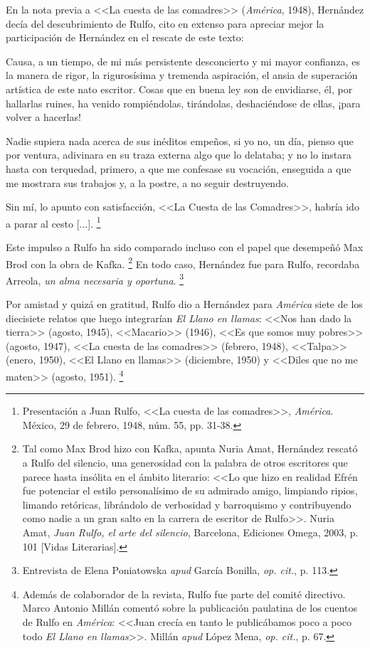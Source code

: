 \documentclass[14pt,twoside,final]{extbook} %
\let\oldfootnote\footnote
\renewcommand\footnote[1]{%
\oldfootnote{\hspace{1mm}#1}}
\begin{document}
En la nota previa a <<La cuesta de las comadres>> (\emph{América}, 1948), Hernández
decía del descubrimiento de Rulfo, cito en extenso para apreciar mejor la
participación de Hernández en el rescate de este texto:
\begin{quoting}
Causa, a un tiempo, de mi más persistente desconcierto y mi mayor confianza, es la manera de rigor, la rigurosísima y tremenda aspiración, el ansia de superación artística de este nato escritor. Cosas que en buena ley son de envidiarse, él, por hallarlas ruines, ha venido rompiéndolas, tirándolas, deshaciéndose de ellas, ¡para volver a hacerlas!

Nadie supiera nada acerca de sus inéditos empeños, si yo no, un día, pienso que por ventura, adivinara en su traza externa algo que lo delataba; y no lo instara hasta con terquedad, primero, a que me confesase su vocación, enseguida a que me mostrara sus trabajos y, a la postre, a no seguir destruyendo.

Sin mí, lo apunto con satisfacción, <<La Cuesta de las Comadres>>, habría ido a parar al cesto [...].\footnote{Presentación a Juan Rulfo, <<La cuesta de las comadres>>, \emph{América}. México, 29 de febrero, 1948, núm. 55, pp. 31-38.}
\end{quoting}
Este impulso a Rulfo ha sido comparado incluso con el papel que desempeñó Max
Brod con la obra de Kafka.\footnote{Tal como Max Brod hizo con Kafka, apunta Nuria Amat, Hernández rescató a Rulfo del silencio, una generosidad con la palabra de otros escritores que parece hasta insólita en el ámbito literario: <<Lo que hizo en realidad Efrén fue potenciar el estilo personalísimo de su admirado amigo, limpiando
ripios, limando retóricas, librándolo de verbosidad y barroquismo y contribuyendo como nadie a un gran salto en la carrera de escritor de Rulfo>>. Nuria Amat, \emph{Juan Rulfo, el arte del silencio}, Barcelona, Ediciones Omega, 2003, p. 101 [Vidas Literarias].} En todo caso, Hernández fue para Rulfo, recordaba
Arreola, \emph{un alma necesaria y oportuna}.\footnote{Entrevista de Elena Poniatowska \emph{apud} García Bonilla, \emph{op. cit.}, p. 113.}

Por amistad y quizá en gratitud, Rulfo dio a Hernández para \emph{América} siete de
los diecisiete relatos que luego integrarían \emph{El Llano en llamas}: <<Nos han dado la tierra>> (agosto, 1945), <<Macario>> (1946), <<Es que somos muy pobres>> (agosto, 1947), <<La cuesta de las comadres>> (febrero, 1948), <<Talpa>> (enero, 1950), <<El Llano en llamas>> (diciembre, 1950) y <<Diles que no me maten>> (agosto, 1951).\footnote{Además de colaborador de la revista, Rulfo fue parte del comité directivo. Marco Antonio Millán comentó sobre la publicación paulatina de los cuentos de Rulfo en \emph{América}: <<Juan crecía en tanto le publicábamos poco a poco todo \emph{El Llano en llamas}>>. Millán \emph{apud} López Mena, \emph{op. cit.}, p. 67.}
\end{document}
